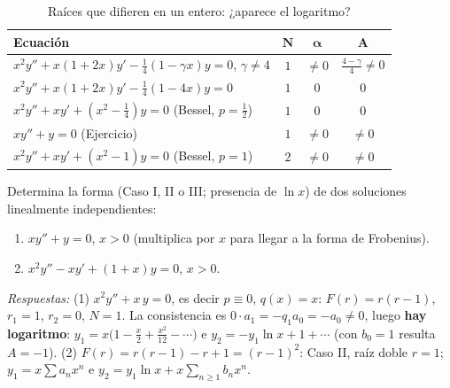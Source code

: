 \begin{table}[H]
\centering
\small
\caption{Raíces que difieren en un entero: ¿aparece el logaritmo?}
\label{tab:s4-log}
\begin{tabular}{|p{6.4cm}|c|c|c|}
\hline
\rowcolor{bbe!15}\textbf{Ecuación} & $\mathbf{N}$ & $\boldsymbol{\alpha}$ & $\mathbf{A}$ \\ \hline
$x^2y''+x(1+2x)y'-\frac14(1-\gamma x)y=0$, $\gamma\ne4$ & $1$ & $\ne0$ & $\frac{4-\gamma}{4}\neq0$ \\ \hline
$x^2y''+x(1+2x)y'-\frac14(1-4x)y=0$ & $1$ & $0$ & $0$ \\ \hline
$x^2y''+xy'+(x^2-\frac14)y=0$ (Bessel, $p=\frac12$) & $1$ & $0$ & $0$ \\ \hline
$xy''+y=0$ (Ejercicio) & $1$ & $\ne0$ & $\ne0$ \\ \hline
$x^2y''+xy'+(x^2-1)y=0$ (Bessel, $p=1$) & $2$ & $\ne0$ & $\ne0$ \\ \hline
\end{tabular}
\end{table}
 
\begin{exercise}
Determina la forma (Caso I, II o III; presencia de $\ln x$) de dos soluciones linealmente independientes:
\begin{enumerate}
\item $xy''+y=0$, $x>0$ (multiplica por $x$ para llegar a la forma de Frobenius).
\item $x^2y''-xy'+(1+x)y=0$, $x>0$.
\end{enumerate}
\emph{Respuestas:} (1) $x^2y''+x\,y=0$, es decir $p\equiv0$, $q(x)=x$: $F(r)=r(r-1)$, $r_1=1$, $r_2=0$, $N=1$. La consistencia es $0\cdot a_1=-q_1a_0=-a_0\neq0$, luego \textbf{hay logaritmo}: $y_1=x\bigl(1-\frac x2+\frac{x^2}{12}-\cdots\bigr)$ e $y_2=-y_1\ln x+1+\cdots$ (con $b_0=1$ resulta $A=-1$). \; (2) $F(r)=r(r-1)-r+1=(r-1)^2$: Caso II, raíz doble $r=1$; $y_1=x\sum a_nx^n$ e $y_2=y_1\ln x+x\sum_{n\ge1}b_nx^n$.
\end{exercise}
